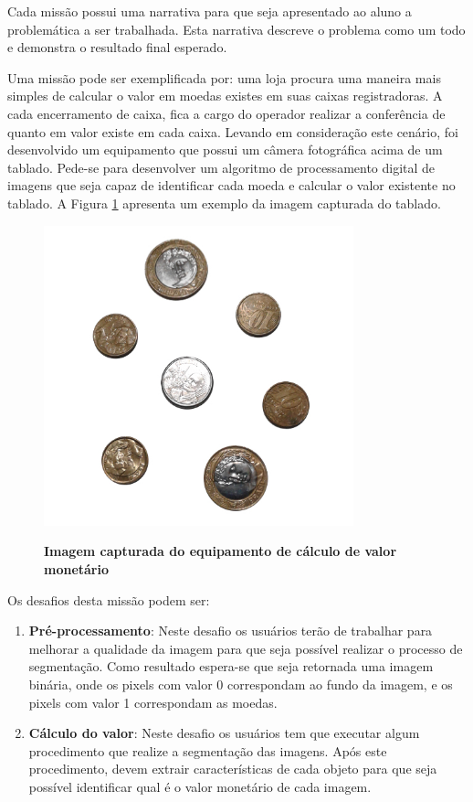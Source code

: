 \documentclass[
	12pt,				%
	oneside,			%
	a4paper,			%
	english,			%
	french,				%
	spanish,			%
	brazil,				%
	]{abntex2}
\begin{document}
Cada missão possui uma narrativa para que seja apresentado ao aluno a problemática a ser trabalhada. Esta narrativa descreve o problema como um todo e demonstra o resultado final esperado. 

Uma missão pode ser exemplificada por:
uma loja procura uma maneira mais simples de calcular o valor em moedas existes em suas caixas registradoras. A cada encerramento de caixa, fica a cargo do operador realizar a conferência de quanto em valor existe em cada caixa. Levando em consideração este cenário, foi desenvolvido um equipamento que possui um câmera fotográfica acima de um tablado. Pede-se para desenvolver um algoritmo de processamento digital de imagens que seja capaz de identificar cada moeda e calcular o valor existente no tablado. A Figura \ref{fig:exemploNarrativa} apresenta um exemplo da imagem capturada do tablado. 

\begin{figure}[ht]
\centering
\caption{\textbf{Imagem capturada do equipamento de cálculo de valor monetário}}
\includegraphics[width=0.8\textwidth]{imagens/moedas.jpg}
\sourceAuthor
\label{fig:exemploNarrativa}
\end{figure}

Os desafios desta missão podem ser:

\begin{enumerate}
\item \textbf{Pré-processamento}: Neste desafio os usuários terão de trabalhar para melhorar a qualidade da imagem para que seja possível realizar o processo de segmentação. Como resultado espera-se que seja retornada uma imagem binária, onde os pixels com valor 0 correspondam ao fundo da imagem, e os pixels com valor 1 correspondam as moedas.
\item \textbf{Cálculo do valor}: Neste desafio os usuários tem que executar algum procedimento que realize a segmentação das imagens. Após este procedimento, devem extrair características de cada objeto para que seja possível identificar qual é o valor monetário de cada imagem.
\end{enumerate}
\end{document}
